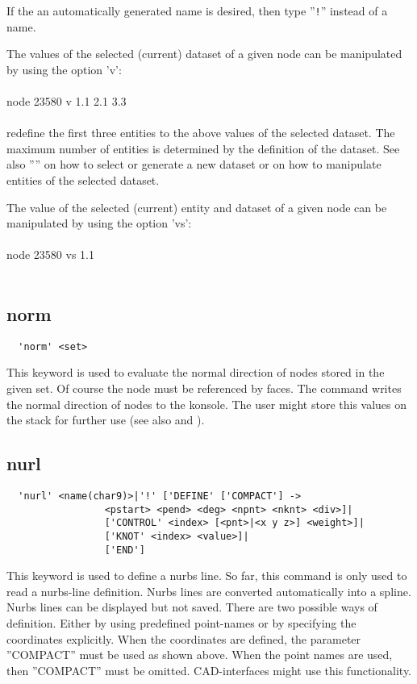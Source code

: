 \documentclass{article}
\begin{document}
If the an automatically generated name is desired, then type ''\verb_!_'' instead of a name.

The values of the selected (current) dataset of a given node can be manipulated by using the option 'v':\\\\
node 23580 v 1.1 2.1 3.3\\\\
redefine the first three entities to the above values of the selected dataset. The maximum number of entities is determined by the definition of the dataset. See also '''' on how to select or generate a new dataset or on how to manipulate entities of the selected dataset.

The value of the selected (current) entity and dataset of a given node can be manipulated by using the option 'vs':\\\\
node 23580 vs 1.1\\\\


\subsection{\label{norm}norm}
\begin{verbatim}
  'norm' <set> 
\end{verbatim}
This keyword is used to evaluate the normal direction of nodes stored in the given set. Of course the node must be referenced by faces. The command writes the normal direction of nodes to the konsole. The user might store this values on the stack for further use (see also  and ). 

\subsection{\label{nurl}nurl}
\begin{verbatim}
  'nurl' <name(char9)>|'!' ['DEFINE' ['COMPACT'] ->
                 <pstart> <pend> <deg> <npnt> <nknt> <div>]|
                 ['CONTROL' <index> [<pnt>|<x y z>] <weight>]|
                 ['KNOT' <index> <value>]|
                 ['END']
\end{verbatim}
This keyword is used to define a nurbs line. So far, this command is only used to read a nurbs-line definition. Nurbs lines are converted automatically into a spline. Nurbs lines can be displayed but not saved. There are two possible ways of definition. Either by using predefined point-names or by specifying the coordinates explicitly. When the coordinates are defined, the parameter ''COMPACT'' must be used as shown above. When the point names are used, then ''COMPACT'' must be omitted. CAD-interfaces might use this functionality.
\end{document}
